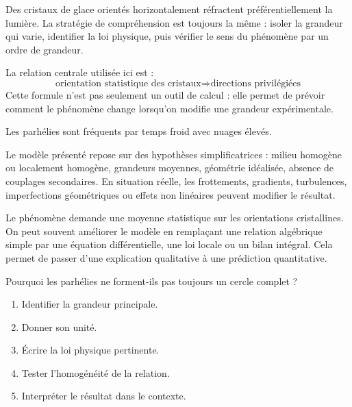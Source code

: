 \documentclass[11pt,a4paper]{article}
\begin{document}
\begin{methodebox}
Des cristaux de glace orientés horizontalement réfractent préférentiellement la lumière.
La stratégie de compréhension est toujours la même : isoler la grandeur qui varie, identifier la loi physique, puis vérifier le sens du phénomène par un ordre de grandeur.
\end{methodebox}

\begin{theorembox}
La relation centrale utilisée ici est :
\[
\text{orientation statistique des cristaux}\Rightarrow\text{directions privilégiées}
\]
Cette formule n'est pas seulement un outil de calcul : elle permet de prévoir comment le phénomène change lorsqu'on modifie une grandeur expérimentale.
\end{theorembox}

\begin{odgbox}
Les parhélies sont fréquents par temps froid avec nuages élevés.
\end{odgbox}

\begin{attentionbox}
Le modèle présenté repose sur des hypothèses simplificatrices : milieu homogène ou localement homogène, grandeurs moyennes, géométrie idéalisée, absence de couplages secondaires. En situation réelle, les frottements, gradients, turbulences, imperfections géométriques ou effets non linéaires peuvent modifier le résultat.
\end{attentionbox}

\begin{approfondissementbox}
Le phénomène demande une moyenne statistique sur les orientations cristallines.
On peut souvent améliorer le modèle en remplaçant une relation algébrique simple par une équation différentielle, une loi locale ou un bilan intégral. Cela permet de passer d'une explication qualitative à une prédiction quantitative.
\end{approfondissementbox}

\begin{exercicebox}
Pourquoi les parhélies ne forment-ils pas toujours un cercle complet ?
\begin{enumerate}
  \item Identifier la grandeur principale.
  \item Donner son unité.
  \item Écrire la loi physique pertinente.
  \item Tester l'homogénéité de la relation.
  \item Interpréter le résultat dans le contexte.
\end{enumerate}
\end{exercicebox}
\end{document}
